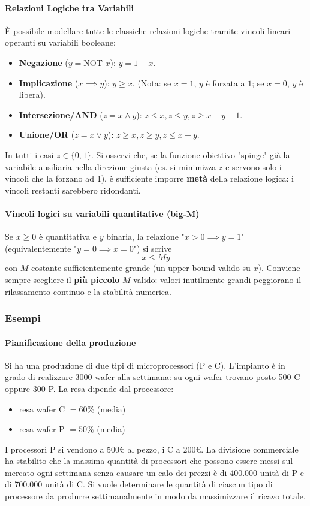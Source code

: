 \documentclass[12pt]{extarticle} %
\begin{document}
\paragraph{Relazioni Logiche tra Variabili}
È possibile modellare tutte le classiche relazioni logiche tramite vincoli lineari operanti su variabili booleane:
\begin{itemize}
    \item \textbf{Negazione} ($y = \text{NOT } x$): $y = 1 - x$.
    \item \textbf{Implicazione} ($x \implies y$): $y \ge x$. (Nota: se $x=1$, $y$ è forzata a $1$; se $x=0$, $y$ è libera).
    \item \textbf{Intersezione/AND} ($z = x \wedge y$): $z \le x, z \le y, z \ge x + y - 1$.
    \item \textbf{Unione/OR} ($z = x \vee y$): $z \ge x, z \ge y, z \le x + y$.
\end{itemize}
In tutti i casi $z\in\{0,1\}$. Si osservi che, se la funzione obiettivo "spinge" già la variabile ausiliaria nella direzione giusta (es. si minimizza $z$ e servono solo i vincoli che la forzano ad 1), è sufficiente imporre \textbf{metà} della relazione logica: i vincoli restanti sarebbero ridondanti.

\paragraph{Vincoli logici su variabili quantitative (big-M)}
Se $x \ge 0$ è quantitativa e $y$ binaria, la relazione "$x > 0 \implies y = 1$" (equivalentemente "$y=0 \implies x=0$") si scrive
\[
x \le M y
\]
con $M$ costante sufficientemente grande (un upper bound valido su $x$). Conviene sempre scegliere il \textbf{più piccolo} $M$ valido: valori inutilmente grandi peggiorano il rilassamento continuo e la stabilità numerica.

\subsubsection{Esempi}
\paragraph{Pianificazione della produzione} Si ha una produzione di due tipi di microprocessori (P e C). L'impianto è in grado di realizzare 3000 wafer alla settimana: su ogni wafer trovano posto 500 C oppure 300 P. La resa dipende dal processore:
\begin{itemize}
    \item resa wafer C $=60\%$ (media)
    \item resa wafer P $=50\%$ (media)
\end{itemize}
I processori P si vendono a 500€ al pezzo, i C a 200€. La divisione commerciale ha stabilito che la massima quantità di processori che possono essere messi sul mercato ogni settimana senza causare un calo dei prezzi è di 400.000 unità di P e di 700.000 unità di C. Si vuole determinare le quantità di ciascun tipo di processore da produrre settimanalmente in modo da massimizzare il ricavo totale.\\
\end{document}
